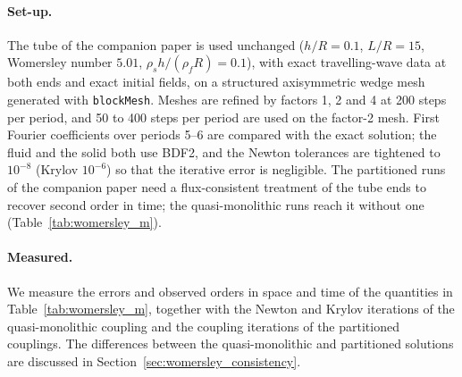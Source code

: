 \paragraph{Set-up.}
The tube of the companion paper is used unchanged ($h/R = 0.1$, $L/R = 15$, Womersley number $5.01$, $\rho_s h/(\rho_f R) = 0.1$), with exact travelling-wave data at both ends and exact initial fields, on a structured axisymmetric wedge mesh generated with \texttt{blockMesh}.
Meshes are refined by factors 1, 2 and 4 at 200 steps per period, and 50 to 400 steps per period are used on the factor-2 mesh.
First Fourier coefficients over periods 5--6 are compared with the exact solution; the fluid and the solid both use BDF2, and the Newton tolerances are tightened to $10^{-8}$ (Krylov $10^{-6}$) so that the iterative error is negligible.
The partitioned runs of the companion paper need a flux-consistent treatment of the tube ends to recover second order in time; the quasi-monolithic runs reach it without one (Table~\ref{tab:womersley_m}).

\paragraph{Measured.}
We measure the errors and observed orders in space and time of the quantities in Table~\ref{tab:womersley_m}, together with the Newton and Krylov iterations of the quasi-monolithic coupling and the coupling iterations of the partitioned couplings.
The differences between the quasi-monolithic and partitioned solutions are discussed in Section~\ref{sec:womersley_consistency}.

